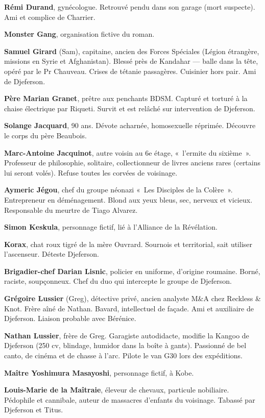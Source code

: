 \textbf{Rémi Durand}, gynécologue. Retrouvé pendu dans son garage (mort suspecte). Ami et complice de Charrier.

\textbf{Monster Gang}, organisation fictive du roman.

\textbf{Samuel Girard} (Sam), capitaine, ancien des Forces Spéciales (Légion étrangère, missions en Syrie et Afghanistan). Blessé près de Kandahar --- balle dans la tête, opéré par le Pr Chauveau. Crises de tétanie passagères. Cuisinier hors pair. Ami de Djeferson.

\textbf{Père Marian Granet}, prêtre aux penchants BDSM. Capturé et torturé à la chaise électrique par Riqueti. Survit et est relâché sur intervention de Djeferson.

\textbf{Solange Jacquard}, 90 ans. Dévote acharnée, homosexuelle réprimée. Découvre le corps du père Beaubois.

\textbf{Marc-Antoine Jacquinot}, autre voisin au 6e étage, «~l'ermite du sixième~». Professeur de philosophie, solitaire, collectionneur de livres anciens rares (certains lui seront volés). Refuse toutes les corvées de voisinage.

\textbf{Aymeric Jégou}, chef du groupe néonazi «~Les Disciples de la Colère~». Entrepreneur en déménagement. Blond aux yeux bleus, sec, nerveux et vicieux. Responsable du meurtre de Tiago Alvarez.

\textbf{Simon Keskula}, personnage fictif, lié à l'Alliance de la Révélation.

\textbf{Korax}, chat roux tigré de la mère Ouvrard. Sournois et territorial, sait utiliser l'ascenseur. Déteste Djeferson.

\textbf{Brigadier-chef Darian Lisnic}, policier en uniforme, d'origine roumaine. Borné, raciste, soupçonneux. Chef du duo qui intercepte le groupe de Djeferson.

\textbf{Grégoire Lussier} (Greg), détective privé, ancien analyste M\&A chez Reckless \& Knot. Frère aîné de Nathan. Bavard, intellectuel de façade. Ami et auxiliaire de Djeferson. Liaison probable avec Bérénice.

\textbf{Nathan Lussier}, frère de Greg. Garagiste autodidacte, modifie la Kangoo de Djeferson (250 cv, blindage, humidor dans la boîte à gants). Passionné de bel canto, de cinéma et de chasse à l'arc. Pilote le van G30 lors des expéditions.

\textbf{Maître Yoshimura Masayoshi}, personnage fictif, à Kobe.

\textbf{Louis-Marie de la Maîtraie}, éleveur de chevaux, particule nobiliaire. Pédophile et cannibale, auteur de massacres d'enfants du voisinage. Tabassé par Djeferson et Titus.

